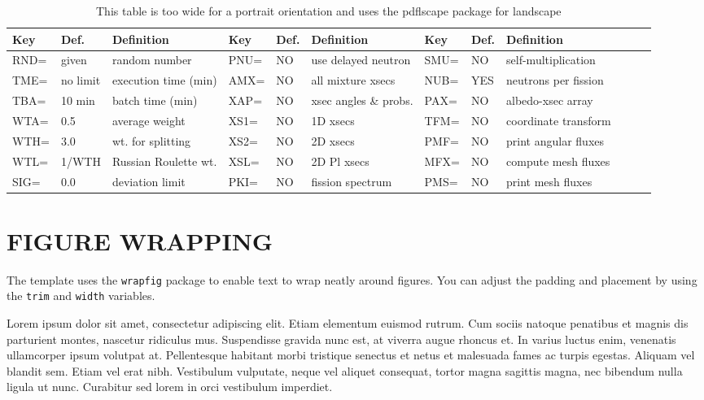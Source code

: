 \documentclass[tm]{ornltm} %
\begin{document}
\begin{landscape} %
\begin{table}
  \caption{This table is too wide for a portrait orientation and uses the pdflscape package for landscape}\label{tab:2}
  \centering
  \begin{tabular}{llllllllllll}
  \toprule
  Key  & Def.     & Definition           & Key  & Def. & Definition            & Key  & Def. & Definition           \\
  \midrule
  RND= & given    & random number        & PNU= & NO   & use delayed neutron   & SMU= & NO   & self-multiplication  \\
  TME= & no limit & execution time (min) & AMX= & NO   & all mixture xsecs     & NUB= & YES  & neutrons per fission \\
  TBA= & 10 min   & batch time (min)     & XAP= & NO   & xsec angles \& probs. & PAX= & NO   & albedo-xsec array    \\
  WTA= & 0.5      & average weight       & XS1= & NO   & 1D xsecs             & TFM= & NO   & coordinate transform \\
  WTH= & 3.0      & wt. for splitting    & XS2= & NO   & 2D xsecs             & PMF= & NO   & print angular fluxes \\
  WTL= & 1/WTH    & Russian Roulette wt. & XSL= & NO   & 2D Pl xsecs          & MFX= & NO   & compute mesh fluxes  \\
  SIG= & 0.0      & deviation limit      & PKI= & NO   & fission spectrum      & PMS= & NO   & print mesh fluxes    \\
  \bottomrule
  \end{tabular}
\end{table}
\end{landscape}

\section{FIGURE WRAPPING}
\label{sec:figwrap}

The template uses the \verb|wrapfig| package to enable text to wrap neatly
around figures. You can adjust the padding and placement by using the
\verb|trim| and \verb|width| variables.

Lorem ipsum dolor sit amet, consectetur adipiscing elit. Etiam elementum euismod
rutrum. Cum sociis natoque penatibus et magnis dis parturient montes, nascetur
ridiculus mus. Suspendisse gravida nunc est, at viverra augue rhoncus et. In
varius luctus enim, venenatis ullamcorper ipsum volutpat at. Pellentesque
habitant morbi tristique senectus et netus et malesuada fames ac turpis egestas.
Aliquam vel blandit sem. Etiam vel erat nibh. Vestibulum vulputate, neque vel
aliquet consequat, tortor magna sagittis magna, nec bibendum nulla ligula ut
nunc. Curabitur sed lorem in orci vestibulum imperdiet.
\end{document}

